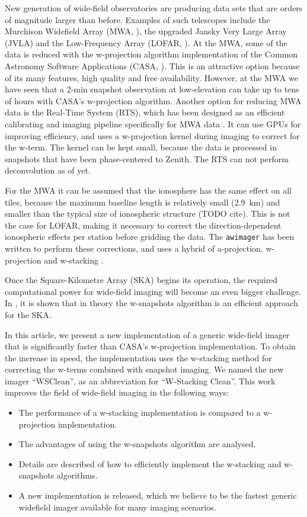\documentclass[useAMS,usenatbib]{mn2e}
\begin{document}
New generation of wide-field observatories are producing data sets that are orders of magnitude larger than before. Examples of such telescopes include the Murchison Widefield Array (MWA, \citealt{mwa}), the upgraded Jansky Very Large Array (JVLA) and the Low-Frequency Array (LOFAR, \citealt{lofar-2013}). At the MWA, some of the data is reduced with the w-projection algorithm implementation of the Common Astronomy Software Applications (CASA, \citealt{casa}). This is an attractive option because of its many features, high quality and free availability. However, at the MWA we have seen that a 2-min snapshot observation at low-elevation can take up to tens of hours with CASA's w-projection algorithm. Another option for reducing MWA data is the Real-Time System (RTS), which has been designed as an efficient calibrating and imaging pipeline specifically for MWA data \citep{rts-mwa}. It can use GPUs for improving efficiency, and uses a w-projection kernel during imaging to correct for the w-term. The kernel can be kept small, because the data is processed in snapshots that have been phase-centered to Zenith. The RTS can not perform deconvolution as of yet.

For the MWA it can be assumed that the ionosphere has the same effect on all tiles, because the maximum baseline length is relatively small (2.9~km) and smaller than the typical size of ionospheric structure (TODO cite). This is not the case for LOFAR, making it necessary to correct the direction-dependent ionospheric effects per station before gridding the data. The \texttt{awimager} has been written to perform these corrections, and uses a hybrid of a-projection, w-projection and w-stacking \citep{awimager-2013}.

Once the Square-Kilometre Array (SKA) begins its operation, the required computational power for wide-field imaging will become an even bigger challenge. In \citet{widefield-imaging-ska-cornwell}, it is shown that in theory the w-snapshots algorithm is an efficient approach for the SKA.

In this article, we present a new implementation of a generic wide-field imager that is significantly faster than CASA's w-projection implementation. To obtain the increase in speed, the implementation uses the w-stacking method for correcting the w-terms combined with snapshot imaging. We named the new imager ``WSClean'', as an abbreviation for ``W-Stacking Clean''. This work improves the field of wide-field imaging in the following ways:
\begin{itemize}
 \item The performance of a w-stacking implementation is compared to a w-projection implementation.
 \item The advantages of using the w-snapshots algorithm are analysed.
 \item Details are described of how to efficiently implement the w-stacking and w-snapshots algorithms.
 \item A new implementation is released, which we believe to be the fastest generic widefield imager available for many imaging scenarios.
\end{itemize}
\end{document}
